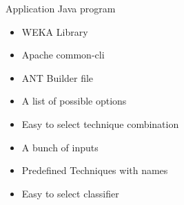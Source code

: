\begin{frame}{Application}
\bs
\bi
\mi Java program
\begin{itemize}
  \item WEKA Library
  \item Apache common-cli
  \item ANT Builder file
  \item A list of possible options
  \item Easy to select technique combination
  \item A bunch of inputs
  \item Predefined Techniques with names
  \item Easy to select classifier
\end{itemize}

\ei

\end{frame}